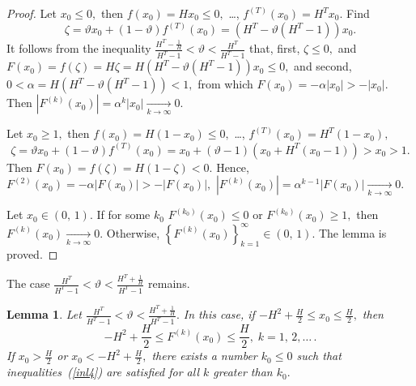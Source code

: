\documentclass[12pt,a4paper]{amsart}
\newtheorem{lemma}{Lemma}
\begin{document}
\begin{proof}
Let $x_0\leq 0,$ then $f(x_0)=Hx_0\leq 0,$ \ldots, $f^{(T)}(x_0)=H^T x_0.$ Find 
$$
\zeta=\vartheta x_0 + (1-\vartheta)f^{(T)}(x_0)=\left(H^T - \vartheta (H^T - 1)\right)x_0.
$$
It follows from the inequality $\frac{H^T-\frac{1}{H}}{H^T-1}<\vartheta<\frac{H^T}{H^T-1}$ that, first, $\zeta\leq 0,$ 
and $F(x_0)=f(\zeta)=H\zeta=H\left(H^T - \vartheta (H^T - 1)\right)x_0\leq 0,$ and second, 
$0<\alpha = H\left(H^T - \vartheta (H^T - 1)\right)<1,$ from which $F(x_0)=-\alpha|x_0|>-|x_0|.$ Then 
$\left|F^{(k)}(x_0)\right|=\alpha^k |x_0|\xrightarrow[k\rightarrow\infty]{}0.$

Let $x_0\geq 1,$ then $f(x_0)=H(1-x_0)\leq 0,$ \ldots, $f^{(T)}(x_0)=H^T (1-x_0),$
$$
\zeta=\vartheta x_0 + (1-\vartheta)f^{(T)}(x_0)=x_0+(\vartheta-1)\left(x_0 + H^T (x_0-1)\right)>x_0>1.
$$
Then $F(x_0)=f(\zeta)=H(1-\zeta) < 0.$ Hence, $F^{(2)}(x_0)=-\alpha\left|F(x_0)\right|>-\left|F(x_0)\right|,$
$\left|F^{(k)}(x_0)\right|=\alpha^{k-1} \left|F(x_0)\right| \xrightarrow[k\rightarrow\infty]{}0.$

Let $x_0\in(0,\,1).$ If for some $k_0$ $F^{(k_0)}(x_0)\leq 0$ or $F^{(k_0)}(x_0)\geq 1,$ then 
$F^{(k)}(x_0)\xrightarrow[k\rightarrow\infty]{}0.$ Otherwise, $\left\{F^{(k)}(x_0)\right\}_{k=1}^{\infty}\in(0,\,1).$
The lemma is proved. 
\end{proof}

The case $\frac{H^T}{H^T-1}<\vartheta<\frac{H^T+\frac{1}{H}}{H^T-1}$ remains.

\begin{lemma}\label{l4}
Let $\frac{H^T}{H^T-1}<\vartheta<\frac{H^T+\frac{1}{H}}{H^T-1}.$ In this case, if $-H^2+\frac{H}{2}\leq x_0 \leq \frac{H}{2},$ 
then
\begin{equation}\label{inl4}
-H^2+\frac{H}{2}\leq F^{(k)}(x_0) \leq \frac{H}{2},\;k=1,\,2,\ldots\,.
\end{equation}
If $x_0>\frac{H}{2}$ or $x_0<-H^2+\frac{H}{2},$ there exists a number $k_0\leq 0$ such that inequalities~(\ref{inl4}) are satisfied 
for all $k$ greater than $k_0.$ 
\end{lemma}
\end{document}

